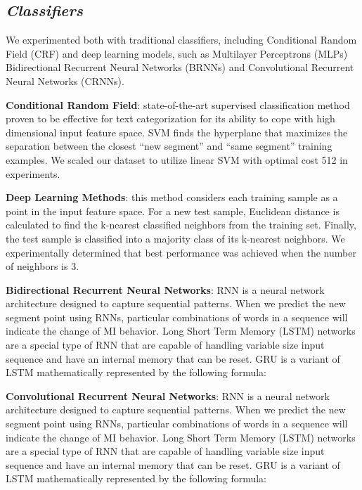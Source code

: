 \documentclass{amia}
\begin{document}
\subsection*{\textit{Classifiers}}

We experimented both with traditional classifiers, including Conditional Random Field (CRF) and deep learning models, such as Multilayer Perceptrons (MLPs) Bidirectional Recurrent Neural Networks (BRNNs) and Convolutional Recurrent Neural Networks (CRNNs).

\textbf{Conditional Random Field}: state-of-the-art supervised classification method proven to be effective for text categorization\cite{joachims1998text} for its ability to cope with high dimensional input feature space. SVM finds the hyperplane that maximizes the separation between the closest ``new segment'' and ``same segment'' training examples. We scaled our dataset to utilize linear SVM with optimal cost 512 in experiments.   

\textbf{Deep Learning Methods}: this method considers each training sample as a point in the input feature space. For a new test sample, Euclidean distance is calculated to find the k-nearest classified neighbors from the training set. Finally, the test sample is classified into a majority class of its k-nearest neighbors. We experimentally determined that best performance was achieved when the number of neighbors is 3. 

\textbf{Bidirectional Recurrent Neural Networks}: RNN is a neural network architecture designed to capture sequential patterns. When we predict the new segment point using RNNs, particular combinations of words in a sequence will indicate the change of MI behavior. Long Short Term Memory (LSTM) networks\cite{hochreiter1997long} are a special type of RNN that are capable of handling variable size input sequence and have an internal memory that can be reset. GRU\cite{chung2014empirical} is a variant of LSTM mathematically represented by the following formula:

\textbf{Convolutional Recurrent Neural Networks}: RNN is a neural network architecture designed to capture sequential patterns. When we predict the new segment point using RNNs, particular combinations of words in a sequence will indicate the change of MI behavior. Long Short Term Memory (LSTM) networks\cite{hochreiter1997long} are a special type of RNN that are capable of handling variable size input sequence and have an internal memory that can be reset. GRU\cite{chung2014empirical} is a variant of LSTM mathematically represented by the following formula:
\end{document}
